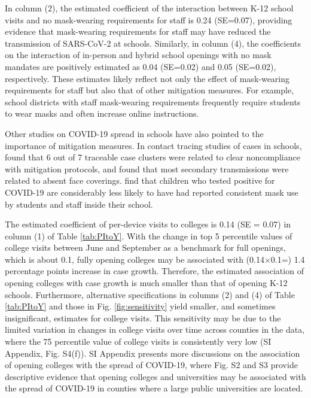 \documentclass[9pt,twocolumn,twoside,lineno]{pnas-new}
\begin{document}
In column (2), the estimated coefficient of the interaction between K-12 school visits and no mask-wearing requirements for staff is 0.24 (SE=0.07),   providing evidence that mask-wearing requirements for staff may have reduced the transmission of SARS-CoV-2  at schools. Similarly, in column (4), the coefficients on the interaction of in-person and hybrid school openings with no mask mandates are positively estimated as 0.04 (SE=0.02) and 0.05 (SE=0.02), respectively.   These estimates likely reflect not only the effect of mask-wearing requirements for staff but also that of other mitigation measures. For example, school districts with staff mask-wearing requirements frequently require students to wear masks and often increase online instructions.

Other studies on COVID-19 spread in schools have also pointed to the importance of mitigation measures. In contact tracing studies of cases in schools, \cite{gillespie2021} found that 6 out of 7 traceable case clusters were related to clear noncompliance with mitigation protocols, and  \cite{zimmerman2020} found that most secondary transmissions were related to absent face coverings.
\cite{hobbs2020} find that children who tested positive for COVID-19 are considerably less likely to have had reported consistent mask use by students and staff inside their school.

The estimated coefficient of per-device visits to colleges is 0.14 (SE = 0.07) in column (1) of  Table \ref{tab:PItoY}.  With the change in top 5 percentile values of college visits between June and September as a benchmark for full openings,  which is about 0.1,  fully opening colleges may be associated with (0.14$\times$0.1=) 1.4 percentage points increase in case growth. Therefore, the estimated association of opening colleges with case growth is much smaller than that of opening K-12 schools. Furthermore, alternative specifications in columns (2) and (4) of Table \ref{tab:PItoY} and those in Fig. \ref{fig:sensitivity}  yield
smaller, and sometimes insignificant, estimates for college visits. This sensitivity may be due to the limited variation in changes in college visits over time across counties in the data, where the 75 percentile value of college visits is consistently very low (SI Appendix, Fig. S4(f)). SI Appendix presents more discussions on the association of opening colleges with the spread of COVID-19, where Fig. S2 and S3 provide descriptive evidence that opening colleges and universities may be associated with the spread of COVID-19 in counties where a large public universities are located.
\end{document}
